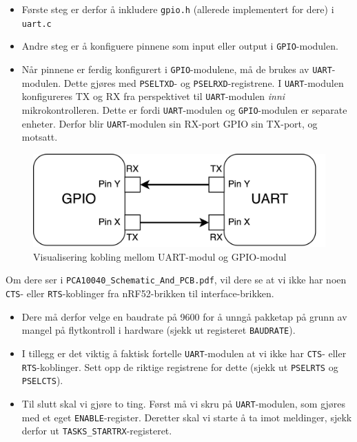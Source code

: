 \begin{itemize}
    \item Første steg er derfor å inkludere \verb|gpio.h| (allerede implementert for dere) i \verb|uart.c|
    \item Andre steg er å konfiguere pinnene som input eller output i \verb|GPIO|-modulen.
    \item Når pinnene er ferdig konfigurert i \verb|GPIO|-modulene, må de brukes av \verb|UART|-modulen. Dette gjøres med \verb|PSELTXD|- og \verb|PSELRXD|-registrene. I \verb|UART|-modulen konfigureres TX og RX fra perspektivet til \verb|UART|-modulen {\it inni} mikrokontrolleren. Dette er fordi \verb|UART|-modulen og \verb|GPIO|-modulen er separate enheter. Derfor blir \verb|UART|-modulen sin RX-port GPIO sin TX-port, og motsatt. 
\end{itemize}

\begin{figure}[ht]
    \centering
    \includegraphics[scale=0.20]{Main/figures/UART_PINS.png}
    \caption{Visualisering kobling mellom UART-modul og GPIO-modul}
    \label{fig:uart_and_gpio}
\end{figure}



Om dere ser i \verb|PCA10040_Schematic_And_PCB.pdf|, vil dere se at vi ikke har noen \verb|CTS|- eller \verb|RTS|-koblinger fra nRF52-brikken til interface-brikken. 

\begin{itemize}
    \item Dere må derfor velge en baudrate på 9600 for å unngå pakketap på grunn av mangel på flytkontroll i hardware (sjekk ut registeret \verb|BAUDRATE|).
    \item I tillegg er det viktig å faktisk fortelle \verb|UART|-modulen at vi ikke har \verb|CTS|- eller \verb|RTS|-koblinger. Sett opp de riktige registrene for dette (sjekk ut \verb|PSELRTS| og \verb|PSELCTS|).
    \item 

Til slutt skal vi gjøre to ting. Først må vi skru på \verb|UART|-modulen, som gjøres med et eget \verb|ENABLE|-register. Deretter skal vi starte å ta imot meldinger, sjekk derfor ut \verb|TASKS_STARTRX|-registeret. 
\end{itemize}








